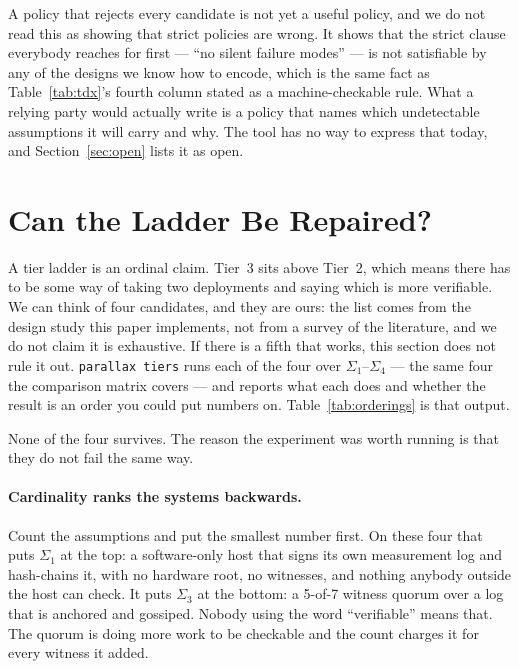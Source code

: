 \documentclass[11pt]{article}
\begin{document}
A policy that rejects every candidate is not yet a useful policy, and we do
not read this as showing that strict policies are wrong. It shows that the
strict clause everybody reaches for first --- ``no silent failure modes''
--- is not satisfiable by any of the designs we know how to encode, which is
the same fact as Table~\ref{tab:tdx}'s fourth column stated as a
machine-checkable rule. What a relying party would actually write is a
policy that names which undetectable assumptions it will carry and why. The
tool has no way to express that today, and Section~\ref{sec:open} lists it
as open.

\section{Can the Ladder Be Repaired?}
\label{sec:tiers}

A tier ladder is an ordinal claim. Tier~3 sits above Tier~2, which means
there has to be some way of taking two deployments and saying which is more
verifiable. We can think of four candidates, and they are ours: the list
comes from the design study this paper implements, not from a survey of the
literature, and we do not claim it is exhaustive. If there is a fifth that
works, this section does not rule it out.
\texttt{parallax tiers} runs each of the four over $\Sigma_1$--$\Sigma_4$ ---
the same four the comparison matrix covers --- and reports what each does and
whether the result is an order you could put numbers on.
Table~\ref{tab:orderings} is that output.

None of the four survives. The reason the experiment was worth running is
that they do not fail the same way.

\begin{table}[h]
\centering\small
\caption{The four candidate orderings applied to $\Sigma_1$--$\Sigma_4$,
from \texttt{parallax tiers --format tex-orderings}. The middle column reads
left to right as most verifiable to least, under the candidate's own key.
$\Sigma_5$ is excluded because it is a hybrid built to carry a shared
dependency rather than a fifth design competing for a rung; the comparison
matrix leaves it out for the same reason.}
\label{tab:orderings}

\end{table}

\paragraph{Cardinality ranks the systems backwards.} Count the assumptions
and put the smallest number first. On these four that puts $\Sigma_1$ at the
top: a software-only host that signs its own measurement log and hash-chains
it, with no hardware root, no witnesses, and nothing anybody outside the
host can check. It puts $\Sigma_3$ at the bottom:
a 5-of-7 witness quorum over a log that is anchored and gossiped. Nobody
using the word ``verifiable'' means that. The quorum is doing more work to
be checkable and the count charges it for every witness it added.
\end{document}
